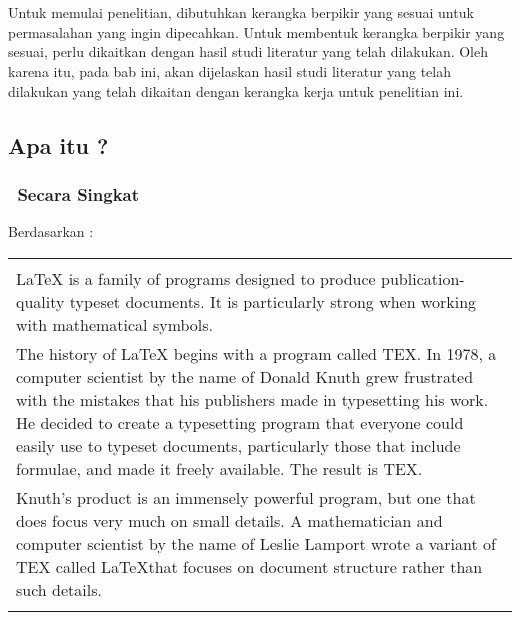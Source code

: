 \chapter{\babDua}
\label{bab:2}
Untuk memulai penelitian, dibutuhkan kerangka berpikir yang sesuai untuk permasalahan yang ingin dipecahkan.
Untuk membentuk kerangka berpikir yang sesuai, perlu dikaitkan dengan hasil studi literatur yang telah dilakukan.
Oleh karena itu, pada bab ini, akan dijelaskan hasil studi literatur yang telah dilakukan yang telah dikaitan dengan kerangka kerja untuk penelitian ini.


\section{Apa itu \latex?}
\label{sec:latex}

\subsection{\latex~Secara Singkat}
\label{sec:latexBrief}
Berdasarkan \cite{latex:intro}: \\
\begin{tabular}{| p{13cm} |}
	\hline
	\\
	LaTeX is a family of programs designed to produce publication-quality typeset documents.
	It is particularly strong when working with mathematical symbols. \\
	The history of LaTeX begins with a program called TEX.
	In 1978, a computer scientist by the name of Donald Knuth grew frustrated with the mistakes that his publishers made in typesetting his work.
	He decided to create a typesetting program that everyone could easily use to typeset documents, particularly those that include formulae, and made it freely available.
	The result is TEX. \\
	Knuth's product is an immensely powerful program, but one that does focus very much on small details.
	A mathematician and computer scientist by the name of Leslie Lamport wrote a variant of TEX called \LaTeX that focuses on document structure rather than such details. \\
	\\
	\hline
\end{tabular}

